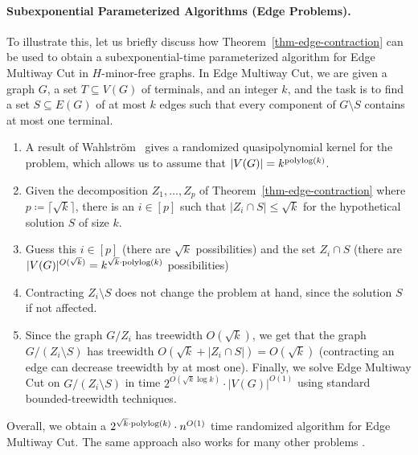 \documentclass[a4paper,11pt]{article}
\numberwithin{lemma}{section}
\begin{document}
\paragraph{Subexponential Parameterized Algorithms (Edge Problems).}

To illustrate this, let us briefly discuss how Theorem~\ref{thm-edge-contraction} can be used to obtain a subexponential-time parameterized algorithm for {\sc Edge Multiway Cut} in $H$-minor-free graphs.
In {\sc Edge Multiway Cut}, we are given a graph $G$, a set $T\subseteq V(G)$ of terminals, and an integer $k$, and the task is to find a set $S\subseteq E(G)$ of at most $k$ edges such that every component of $G \setminus S$ contains at most one terminal.

\begin{enumerate}[label = (\arabic*)]
 \item A result of Wahlström~\cite{Wahlstrom20} gives a randomized quasipolynomial kernel for the problem, which allows us to assume that $|V(G)|=k^{\textup{polylog}(k)}$.
 \item Given the decomposition $Z_1,\dots,Z_p$ of Theorem~\ref{thm-edge-contraction} where $p \coloneqq \lceil\sqrt{k}\rceil$, there is an $i \in [p]$ such that $|Z_i \cap S| \leq \sqrt{k}$ for the hypothetical solution $S$ of size $k$.
 \item Guess this $i \in [p]$ (there are $\sqrt{k}$ possibilities) and the set $Z_i \cap S$ (there are $|V(G)|^{O(\sqrt{k})}=k^{\sqrt{k}\cdot \textup{polylog}(k)}$ possibilities)
 \item Contracting $Z_i \setminus S$ does not change the problem at hand, since the solution $S$ if not affected.
 \item\label{i:rob} Since the graph $G/Z_i$ has treewidth $O(\sqrt{k})$, we get that the graph $G/(Z_i\setminus S)$ has treewidth $O(\sqrt{k}+|Z_i\cap S|)=O(\sqrt{k})$ (contracting an edge can decrease treewidth by at most one).
  Finally, we solve {\sc Edge Multiway Cut} on $G/(Z_i\setminus S)$ in time $2^{O(\sqrt{k}\log k)}\cdot |V(G)|^{O(1)}$ using standard bounded-treewidth techniques.
\end{enumerate}
Overall, we obtain a $2^{\sqrt{k}\cdot \textup{polylog}(k)}\cdot n^{O(1)}$ time randomized algorithm for {\sc Edge Multiway Cut}.
The same approach also works for many other problems \cite{BandyapadhyayLLSJ22,MarxMNT22}.
\end{document}
